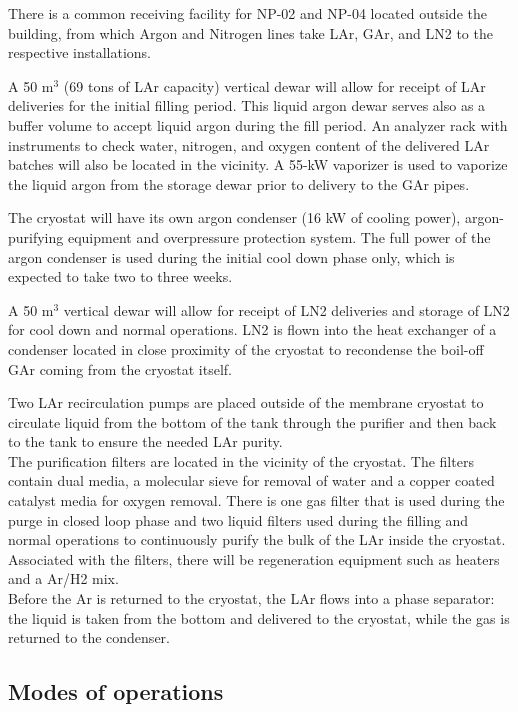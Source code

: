 There is a common receiving facility for NP-02 and NP-04 located outside the building, from which Argon and Nitrogen lines take LAr, GAr, and LN2 to the respective installations.

A 50 m$^3$ (69 tons of LAr capacity) vertical dewar will allow for receipt of LAr deliveries for the initial filling period. This liquid argon dewar serves also as a buffer volume to accept liquid argon during the fill period. An analyzer rack with instruments to check water, nitrogen, and oxygen content of the delivered LAr batches will also be located in the vicinity. A 55-kW vaporizer is used to vaporize the liquid argon from the storage dewar prior to delivery to the GAr pipes.

The cryostat will have its own argon condenser (16 kW of cooling power), argon-purifying equipment and overpressure protection system. The full power of the argon condenser is used during the initial cool down phase only, which is expected to take two to three weeks. 

A 50 m$^3$ vertical dewar will allow for receipt of LN2 deliveries and storage of LN2 for cool down and normal operations. LN2 is flown into the heat exchanger of a condenser located in close proximity of the cryostat to recondense the boil-off GAr coming from the cryostat itself.

Two LAr recirculation pumps are placed outside of the membrane cryostat to circulate liquid from the bottom of the tank through the purifier and then back to the tank to ensure the needed LAr purity.\\
%
The purification filters are located in the vicinity of the cryostat. The filters contain dual media, a molecular sieve for removal of water and a copper coated catalyst media for oxygen removal. There is one gas filter that is used during the purge in closed loop phase and two liquid filters used during the filling and normal operations to continuously purify the bulk of the LAr inside the cryostat. Associated with the filters, there will be regeneration equipment such as heaters and a Ar/H2 mix.\\
%
Before the Ar is returned to the cryostat, the LAr flows into a phase separator: the liquid is taken from the bottom and delivered to the cryostat, while the gas is returned to the condenser.


\subsection{Modes of operations}
\label{sec:cryo-op-modes}

